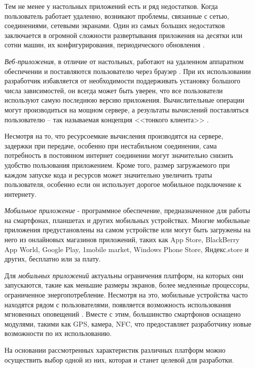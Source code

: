 Тем не менее у настольных приложений есть и ряд недостатков. Когда пользователь работает удаленно, возникают проблемы, связанные с сетью, соединениями, сетевыми экранами. Один из самых больших недостатков заключается в огромной сложности развертывания приложения на десятки или сотни машин, их конфигурирования, периодического обновления \cite{msdn_desktop_vs_web}.

\emph{Веб-приложения}, в отличие от настольных, работают на удаленном аппаратном обеспечении и поставляются пользователю через браузер \cite{web_based_vs_desktop}. При их использовании разработчик избавляется от необходимости поддерживать установку большого числа зависимостей, он всегда может быть уверен, что все пользователи используют самую последнюю версию приложения. Вычислительные операции могут производиться на мощном сервере, а результаты вычислений поставляться пользователю -- так называемая концепция <<тонкого клиента>> \cite{desktop_vs_web_deeper_look}.

Несмотря на то, что ресурсоемкие вычисления производятся на сервере, задержки при передаче, особенно при нестабильном соединении, сама потребность в постоянном интернет соединении могут значительно снизить удобство пользования приложением. Кроме того, размер загружаемого при каждом запуске кода и ресурсов может значительно увеличить траты пользователя, особенно если он использует дорогое мобильное подключение к интернету.

\emph{Мобильное приложение} - программное обеспечение, предназначенное для работы на смартфонах, планшетах и других мобильных устройствах. Многие мобильные приложения предустановлены на самом устройстве или могут быть загружены на него из онлайновых магазинов приложений, таких как App Store, BlackBerry App World, Google Play, 1mobile market, Windows Phone Store, Яндекс.store и других, бесплатно или за плату.

Для \emph{мобильных приложений} актуальны ограничения платформ, на которых они запускаются, такие как меньшие размеры экранов, более медленные процессоры, ограниченное энергопотребление. Несмотря на это, мобильные устройства часто находятся рядом с пользователями, появляется возможность использования мгновенных оповещений \cite{desktop_mobile_differences}. Вместе с этим, большинство смартфонов оснащено модулями, такими как GPS, камера, NFC, что пре\-дос\-тав\-ля\-ет разработчику новые возможности по их использованию.

На основании рассмотренных характеристик различных платформ можно осуществить выбор одной из них, которая и станет целевой для разработки.

